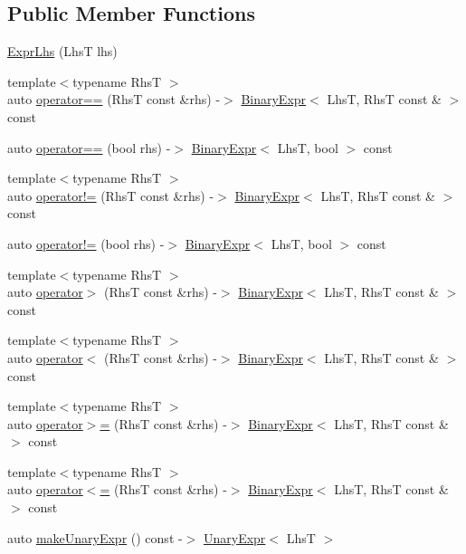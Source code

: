 \subsection*{Public Member Functions}
\begin{DoxyCompactItemize}
\item 
\hyperlink{class_catch_1_1_expr_lhs_ad22c6af1a7d6993240624d299714a479}{Expr\-Lhs} (Lhs\-T lhs)
\item 
{\footnotesize template$<$typename Rhs\-T $>$ }\\auto \hyperlink{class_catch_1_1_expr_lhs_a96537b7d47cf4567fff40d96637f9b96}{operator==} (Rhs\-T const \&rhs) -\/$>$ \hyperlink{class_catch_1_1_binary_expr}{Binary\-Expr}$<$ Lhs\-T, Rhs\-T const \& $>$ const 
\item 
auto \hyperlink{class_catch_1_1_expr_lhs_ac400741dd25a7b2f00996c7bc48b2075}{operator==} (bool rhs) -\/$>$ \hyperlink{class_catch_1_1_binary_expr}{Binary\-Expr}$<$ Lhs\-T, bool $>$ const 
\item 
{\footnotesize template$<$typename Rhs\-T $>$ }\\auto \hyperlink{class_catch_1_1_expr_lhs_a3ad517cc72c85ae7d06e7a081a3c6cb8}{operator!=} (Rhs\-T const \&rhs) -\/$>$ \hyperlink{class_catch_1_1_binary_expr}{Binary\-Expr}$<$ Lhs\-T, Rhs\-T const \& $>$ const 
\item 
auto \hyperlink{class_catch_1_1_expr_lhs_af45381c45e92bc8182e8790d8b1396b9}{operator!=} (bool rhs) -\/$>$ \hyperlink{class_catch_1_1_binary_expr}{Binary\-Expr}$<$ Lhs\-T, bool $>$ const 
\item 
{\footnotesize template$<$typename Rhs\-T $>$ }\\auto \hyperlink{class_catch_1_1_expr_lhs_aff0149e0c0376f9b2e6763f7fefc5c60}{operator$>$} (Rhs\-T const \&rhs) -\/$>$ \hyperlink{class_catch_1_1_binary_expr}{Binary\-Expr}$<$ Lhs\-T, Rhs\-T const \& $>$ const 
\item 
{\footnotesize template$<$typename Rhs\-T $>$ }\\auto \hyperlink{class_catch_1_1_expr_lhs_a1ae37b86c3156b5fbcaaf02726489f85}{operator$<$} (Rhs\-T const \&rhs) -\/$>$ \hyperlink{class_catch_1_1_binary_expr}{Binary\-Expr}$<$ Lhs\-T, Rhs\-T const \& $>$ const 
\item 
{\footnotesize template$<$typename Rhs\-T $>$ }\\auto \hyperlink{class_catch_1_1_expr_lhs_af367c2fe8f97d6f103988627843ad613}{operator$>$=} (Rhs\-T const \&rhs) -\/$>$ \hyperlink{class_catch_1_1_binary_expr}{Binary\-Expr}$<$ Lhs\-T, Rhs\-T const \& $>$ const 
\item 
{\footnotesize template$<$typename Rhs\-T $>$ }\\auto \hyperlink{class_catch_1_1_expr_lhs_a9a5551293bfe9440ef190cb2b20bc0f8}{operator$<$=} (Rhs\-T const \&rhs) -\/$>$ \hyperlink{class_catch_1_1_binary_expr}{Binary\-Expr}$<$ Lhs\-T, Rhs\-T const \& $>$ const 
\item 
auto \hyperlink{class_catch_1_1_expr_lhs_ab68bd6d5d3ae21b7fba9010150fba95d}{make\-Unary\-Expr} () const -\/$>$ \hyperlink{class_catch_1_1_unary_expr}{Unary\-Expr}$<$ Lhs\-T $>$
\end{DoxyCompactItemize}
